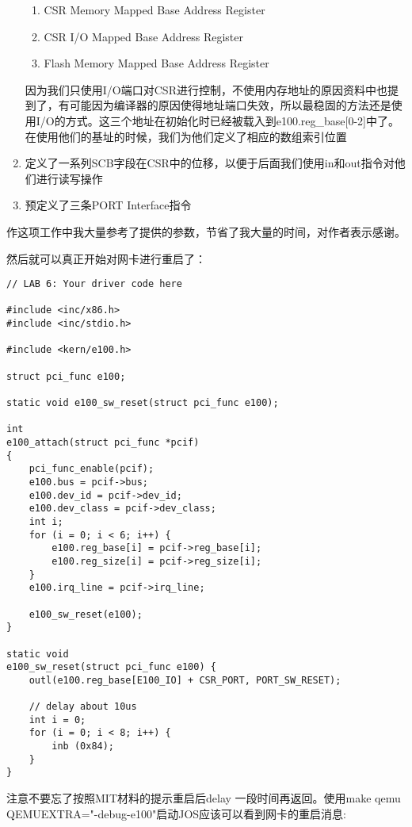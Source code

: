 \documentclass{article}
\begin{document}
\begin{CJK*}{UTF8}{gkai}
\begin{enumerate}
{\begin{enumerate}
\item{CSR Memory Mapped Base Address Register}
\item{CSR I/O Mapped Base Address Register}
\item{Flash Memory Mapped Base Address Register}
\end{enumerate}

因为我们只使用I/O端口对CSR进行控制，不使用内存地址的原因资料中也提到了，有可能因为编译器的原因使得地址端口失效，所以最稳固的方法还是使用I/O的方式。这三个地址在初始化时已经被载入到e100.reg\_base[0-2]中了。在使用他们的基址的时候，我们为他们定义了相应的数组索引位置
}
\item{定义了一系列SCB字段在CSR中的位移，以便于后面我们使用in和out指令对他们进行读写操作}
\item{预定义了三条PORT Interface指令}
\end{enumerate}

作这项工作中我大量参考了提供的参数，节省了我大量的时间，对作者表示感谢。


然后就可以真正开始对网卡进行重启了：


\begin{lstlisting}[style=ccode, title={\scriptsize \ttfamily \bfseries kern/e100.c}]
// LAB 6: Your driver code here

#include <inc/x86.h>
#include <inc/stdio.h>

#include <kern/e100.h>

struct pci_func e100;

static void e100_sw_reset(struct pci_func e100);

int 
e100_attach(struct pci_func *pcif) 
{
    pci_func_enable(pcif);
    e100.bus = pcif->bus;
    e100.dev_id = pcif->dev_id;
    e100.dev_class = pcif->dev_class;
    int i;
    for (i = 0; i < 6; i++) {
    	e100.reg_base[i] = pcif->reg_base[i];
        e100.reg_size[i] = pcif->reg_size[i];
    }
    e100.irq_line = pcif->irq_line;

    e100_sw_reset(e100);
}

static void
e100_sw_reset(struct pci_func e100) {
    outl(e100.reg_base[E100_IO] + CSR_PORT, PORT_SW_RESET);

    // delay about 10us
    int i = 0;
    for (i = 0; i < 8; i++) {
        inb (0x84);
    }
}

\end{lstlisting}

注意不要忘了按照MIT材料的提示重启后delay 一段时间再返回。使用make qemu QEMUEXTRA="-debug-e100"启动JOS应该可以看到网卡的重启消息:


\end{CJK*}
\end{document}
